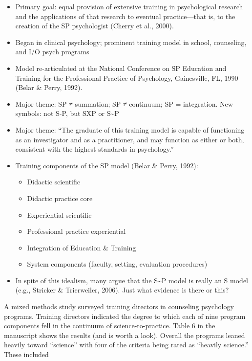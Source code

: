 \documentclass[
  english,
]{book}
\providecommand{\tightlist}{%
  \setlength{\itemsep}{0pt}\setlength{\parskip}{0pt}}
\begin{document}
\begin{itemize}
\tightlist
\item
  Primary goal: equal provision of extensive training in psychological research and the applications of that research to eventual practice---that is, to the creation of the SP psychologist (Cherry et al., 2000).
\item
  Began in clinical psychology; prominent training model in school, counseling, and I/O psych programs
\item
  Model re-articulated at the National Conference on SP Education and Training for the Professional Practice of Psychology, Gainesville, FL, 1990 (Belar \& Perry, 1992).
\item
  Major theme: SP ≠ summation; SP ≠ continuum; SP = integration. New symbols: not S-P, but SXP or S\textasciitilde P
\item
  Major theme: ``The graduate of this training model is capable of functioning as an investigator and as a practitioner, and may function as either or both, consistent with the highest standards in psychology.''
\item
  Training components of the SP model (Belar \& Perry, 1992):

  \begin{itemize}
  \tightlist
  \item
    Didactic scientific
  \item
    Didactic practice core
  \item
    Experiential scientific
  \item
    Professional practice experiential
  \item
    Integration of Education \& Training
  \item
    System components (faculty, setting, evaluation procedures)
  \end{itemize}
\item
  In spite of this idealism, many argue that the S\textasciitilde P model is really an S model (e.g., Stricker \& Trierweiler, 2006). Just what evidence is there or this?
\end{itemize}

A mixed methods study \citep{ridley_scientistpractitioner_2015} surveyed training directors in counseling psychology programs. Training directors indicated the degree to which each of nine program components fell in the continuum of science-to-practice. Table 6 in the manuscript shows the results (and is worth a look). Overall the programs leaned heavily toward ``science'' with four of the criteria being rated as ``heavily science.'' These included
\end{document}
